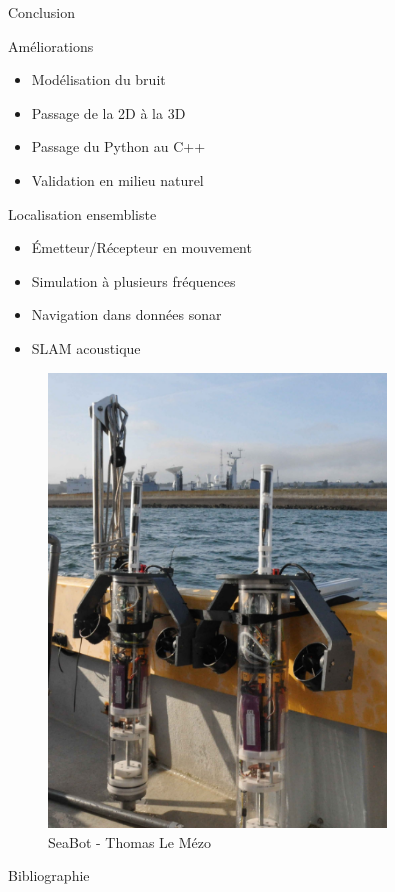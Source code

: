 \documentclass[9pt, xcolor={usenames, dvipsnames}]{beamer}
\begin{document}
			\begin{frame}{Conclusion}
				\centering
				\begin{minipage}{0.55\textwidth}
					\begin{block}{Améliorations}
						\begin{itemize}
							\item Modélisation du bruit 
							\item Passage de la 2D à la 3D
							\item Passage du Python au C++
							\item Validation en milieu naturel
						\end{itemize}
					\end{block}

					\begin{block}{Localisation ensembliste}
						\begin{itemize}
							\item Émetteur/Récepteur en mouvement
							\item Simulation à plusieurs fréquences
							\item Navigation dans données sonar
							\item SLAM acoustique
						\end{itemize}
					\end{block}
				\end{minipage}
				\hfill
				\begin{minipage}{0.4\textwidth}
					\centering
					\begin{figure}
						\includegraphics[width=0.8\textwidth]{images/seabot.png}
						\caption{SeaBot - Thomas Le Mézo}
					\end{figure}
				\end{minipage}
			\end{frame}
	
		\begin{frame}{Bibliographie}
			
			
		\end{frame}
\end{document}
